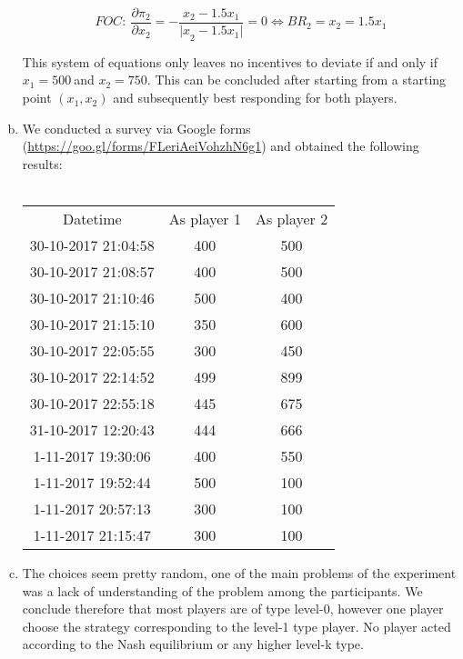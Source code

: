 \documentclass[a4paper]{article}
\begin{document}
\begin{enumerate}[(a)]
\[FOC:\ \frac{\partial\pi_{2}}{\partial x_{2}} = - \frac{x_{2} - 1.5x_{1}}{{|x}_{2} - 1.5x_{1}|} = 0 \Leftrightarrow BR_{2} = x_{2} = 1.5x_{1}\]

This system of equations only leaves no incentives to deviate if and
only if \(x_{1} = 500\ \)and \(x_{2} = 750\). This can be concluded
after starting from a starting point \((x_{1},x_{2})\) and subsequently
best responding for both players.

\item
We conducted a survey via Google forms (\url{https://goo.gl/forms/FLeriAeiVohzhN6g1}) and obtained the following results:\\
\\
\begin{tabular}{ccc}
Datetime & As player 1 & As player 2 \\
30-10-2017 21:04:58 & 400 & 500 \\
30-10-2017 21:08:57 & 400 & 500 \\
30-10-2017 21:10:46 & 500 & 400 \\
30-10-2017 21:15:10 & 350 & 600 \\
30-10-2017 22:05:55 & 300 & 450 \\
30-10-2017 22:14:52 & 499 & 899 \\
30-10-2017 22:55:18 & 445 & 675 \\
31-10-2017 12:20:43 & 444 & 666 \\
1-11-2017 19:30:06 & 400 & 550 \\
1-11-2017 19:52:44 & 500 & 100 \\
1-11-2017 20:57:13 & 300 & 100 \\
1-11-2017 21:15:47 & 300 & 100 \\
\end{tabular}

\item
The choices seem pretty random, one of the main problems of the experiment was a lack of understanding of the problem among the participants. We conclude therefore that most players are of type level-0, however one player choose the strategy corresponding to the level-1 type player. No player acted according to the Nash equilibrium or any higher level-k type.

\end{enumerate}
\end{document}
